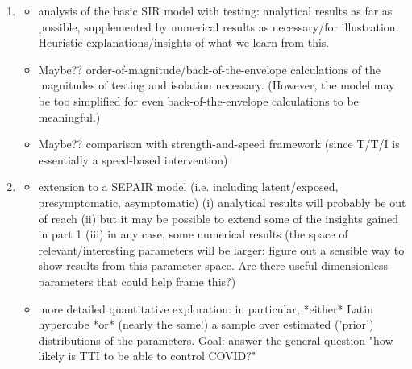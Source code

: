 \documentclass{article}\usepackage[]{graphicx}\usepackage[]{color}
\begin{document}
\begin{enumerate}
\item 
\begin{itemize}
\item analysis of the basic SIR model with testing: analytical results as far as possible, supplemented by numerical results as necessary/for illustration. Heuristic explanations/insights of what we learn from this.
\item Maybe?? order-of-magnitude/back-of-the-envelope calculations of the magnitudes of testing and isolation necessary. (However, the model may be too simplified for even back-of-the-envelope calculations to be meaningful.)
\item Maybe?? comparison with strength-and-speed framework (since T/T/I is essentially a speed-based intervention)
\end{itemize}

\item
\begin{itemize}
\item extension to a SEPAIR model (i.e. including latent/exposed, presymptomatic, asymptomatic)
  (i) analytical results will probably be out of reach
	(ii) but it may be possible to extend some of the insights gained in part 1
	(iii) in any case, some numerical results (the space of relevant/interesting parameters will be larger: figure out a sensible way to show results from this parameter space. Are there useful dimensionless parameters that could help frame this?)
\item more detailed quantitative exploration: in particular, *either* Latin hypercube *or* (nearly the same!) a sample over estimated ('prior') distributions of the parameters. Goal: answer the general question "how likely is TTI to be able to control COVID?"
\end{itemize}
\end{enumerate}




\end{document}
